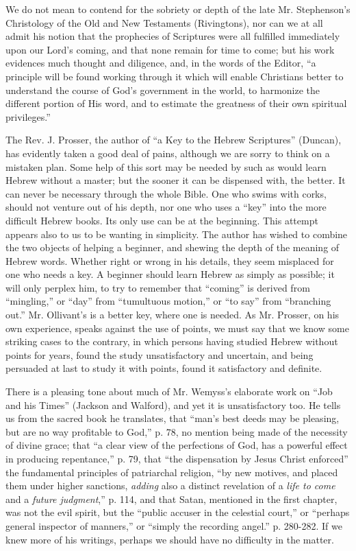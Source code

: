 We do not mean to contend for the sobriety or depth
of the late Mr. Stephenson's Christology of the Old and New Testaments (Rivingtons),
nor can we at all admit his notion that the prophecies of Scriptures
were all fulfilled immediately upon our Lord's coming, and that none
remain for time to come; but his work evidences much thought and
diligence, and, in the words of the Editor, ``a principle will be found
working through it which will enable Christians better to understand the
course of God's government in the world, to harmonize the different
portion of His word, and to estimate the greatness of their own
spiritual privileges.''

The Rev. J. Prosser, the author of ``a Key to the
Hebrew Scriptures'' (Duncan), has evidently taken a good deal of
pains, although we are sorry to think on a mistaken plan. Some help of
this sort may be needed by such as would learn Hebrew without a master;
but the sooner it can be dispensed with, the better. It can never be
necessary through the whole Bible. One who swims with corks, should not
venture out of his depth, nor one who uses a ``key'' into the more
difficult Hebrew books. Its only use can be at the beginning. This
attempt appears also to us to be wanting in simplicity. The author has
wished to combine the two objects of helping a beginner, and shewing the
depth of the meaning of Hebrew words. Whether right or wrong in his
details, they seem misplaced for one who needs a key. A beginner should
learn Hebrew as simply as possible; it will only perplex him, to try to
remember that ``coming'' is derived from ``mingling,'' or ``day'' from ``tumultuous
motion,'' or ``to say'' from ``branching out.'' Mr. Ollivant's is a better
key, where one is needed. As Mr. Prosser, on his own experience, speaks
against the use of points, we must say that we know some striking cases
to the contrary, in which persons having studied Hebrew without points
for years, found the study unsatisfactory and uncertain, and being
persuaded at last to study it with points, found it satisfactory and
definite.

There is a pleasing tone about much of Mr. Wemyss's
elaborate work on ``Job and his Times'' (Jackson and Walford), and yet it
is unsatisfactory too. He tells us from the sacred book he translates,
that ``man's best deeds may be pleasing, but are no way profitable to
God,'' p. 78, no mention being made of the necessity of divine grace;
that ``a clear view of the perfections of God, has a powerful effect in
producing repentance,'' p. 79, that ``the dispensation by Jesus Christ
enforced'' the fundamental principles of patriarchal religion, ``by new
motives, and placed them under higher sanctions, \emph{adding} also a
distinct revelation of a \emph{life to come} and a \emph{future judgment},''
p. 114, and that Satan, mentioned in the first chapter, was not the evil
spirit, but the ``public accuser in the celestial court,'' or ``perhaps
general inspector of manners,'' or ``simply the recording angel.'' p.
280-282. If we knew more of his writings, perhaps we should have no
difficulty in the matter.

